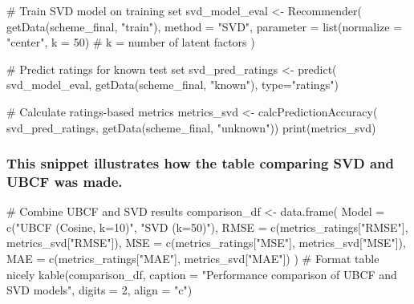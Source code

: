 \documentclass[
  12pt]{article}
\newenvironment{Shaded}{\begin{snugshade}}{\end{snugshade}}
\newcommand{\AttributeTok}[1]{\textcolor[rgb]{0.40,0.45,0.13}{#1}}
\newcommand{\CommentTok}[1]{\textcolor[rgb]{0.37,0.37,0.37}{#1}}
\newcommand{\DecValTok}[1]{\textcolor[rgb]{0.68,0.00,0.00}{#1}}
\newcommand{\FunctionTok}[1]{\textcolor[rgb]{0.28,0.35,0.67}{#1}}
\newcommand{\NormalTok}[1]{\textcolor[rgb]{0.00,0.23,0.31}{#1}}
\newcommand{\OtherTok}[1]{\textcolor[rgb]{0.00,0.23,0.31}{#1}}
\newcommand{\StringTok}[1]{\textcolor[rgb]{0.13,0.47,0.30}{#1}}
\begin{document}
\begin{Shaded}
\begin{Highlighting}[]
\CommentTok{\# Train SVD model on training set}
\NormalTok{svd\_model\_eval }\OtherTok{\textless{}{-}} \FunctionTok{Recommender}\NormalTok{(}
  \FunctionTok{getData}\NormalTok{(scheme\_final, }\StringTok{"train"}\NormalTok{),}
  \AttributeTok{method    =} \StringTok{"SVD"}\NormalTok{,}
  \AttributeTok{parameter =} \FunctionTok{list}\NormalTok{(}\AttributeTok{normalize =} \StringTok{"center"}\NormalTok{, }\AttributeTok{k =} \DecValTok{50}\NormalTok{)  }
  \CommentTok{\# k = number of latent factors}
\NormalTok{)}

\CommentTok{\# Predict ratings for known test set}
\NormalTok{svd\_pred\_ratings }\OtherTok{\textless{}{-}} \FunctionTok{predict}\NormalTok{(}
\NormalTok{  svd\_model\_eval,}
  \FunctionTok{getData}\NormalTok{(scheme\_final, }\StringTok{"known"}\NormalTok{), }
  \AttributeTok{type=}\StringTok{"ratings"}\NormalTok{)}

\CommentTok{\# Calculate ratings{-}based metrics}
\NormalTok{metrics\_svd }\OtherTok{\textless{}{-}} \FunctionTok{calcPredictionAccuracy}\NormalTok{(}
\NormalTok{  svd\_pred\_ratings, }
  \FunctionTok{getData}\NormalTok{(scheme\_final, }\StringTok{"unknown"}\NormalTok{))}
\FunctionTok{print}\NormalTok{(metrics\_svd)}
\end{Highlighting}
\end{Shaded}

\subsubsection{This snippet illustrates how the table comparing SVD and
UBCF was made.}\label{sec-code7}

\begin{Shaded}
\begin{Highlighting}[]
\CommentTok{\# Combine UBCF and SVD results }
\NormalTok{comparison\_df }\OtherTok{\textless{}{-}} \FunctionTok{data.frame}\NormalTok{(}
  \AttributeTok{Model  =} \FunctionTok{c}\NormalTok{(}\StringTok{"UBCF (Cosine, k=10)"}\NormalTok{, }\StringTok{"SVD (k=50)"}\NormalTok{),}
  \AttributeTok{RMSE   =} \FunctionTok{c}\NormalTok{(metrics\_ratings[}\StringTok{"RMSE"}\NormalTok{], metrics\_svd[}\StringTok{"RMSE"}\NormalTok{]),}
  \AttributeTok{MSE    =} \FunctionTok{c}\NormalTok{(metrics\_ratings[}\StringTok{"MSE"}\NormalTok{],  metrics\_svd[}\StringTok{"MSE"}\NormalTok{]),}
  \AttributeTok{MAE    =} \FunctionTok{c}\NormalTok{(metrics\_ratings[}\StringTok{"MAE"}\NormalTok{],  metrics\_svd[}\StringTok{"MAE"}\NormalTok{])}
\NormalTok{)}
\CommentTok{\# Format table nicely}
\FunctionTok{kable}\NormalTok{(comparison\_df, }
      \AttributeTok{caption =} \StringTok{"Performance comparison of UBCF and SVD models"}\NormalTok{,}
      \AttributeTok{digits =} \DecValTok{2}\NormalTok{, }\AttributeTok{align =} \StringTok{"c"}\NormalTok{)}
\end{Highlighting}
\end{Shaded}
\end{document}
